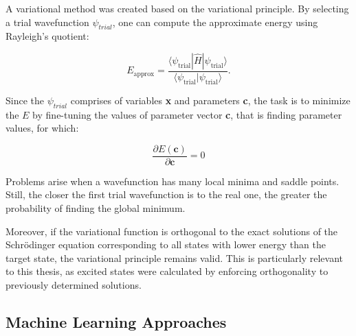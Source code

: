 A variational method was created based on the variational principle. By selecting a trial wavefunction $\psi_{trial}$, one can compute the approximate energy using Rayleigh's quotient:

\begin{equation} E_{\text{approx}} = \frac{\langle \psi_{\text{trial}} | \hat{H} | \psi_{\text{trial}} \rangle}{\langle \psi_{\text{trial}} | \psi_{\text{trial}} \rangle}. \end{equation}

Since the $\psi_{trial}$ comprises of variables \textbf{x} and parameters \textbf{c}, the task is to minimize the $E$  by fine-tuning the values of parameter vector \textbf{c}, that is finding parameter values, for which\cite{IzaacWang2018ComputationalQM}:

\begin{equation} 
	\frac{\partial E(\textbf{c})}{\partial \textbf{c}} = 0
\end{equation}

Problems arise when a wavefunction has many local minima and saddle points. Still, the closer the first trial wavefunction is to the real one, the greater the probability of finding the global minimum.

Moreover, if the variational function is orthogonal to the exact solutions of the Schrödinger equation corresponding to all states with lower energy than the target state, the variational principle remains valid.\cite{ideas_of_qc} This is particularly relevant to this thesis, as excited states were calculated by enforcing orthogonality to previously determined solutions.


\subsection{Machine Learning Approaches}

